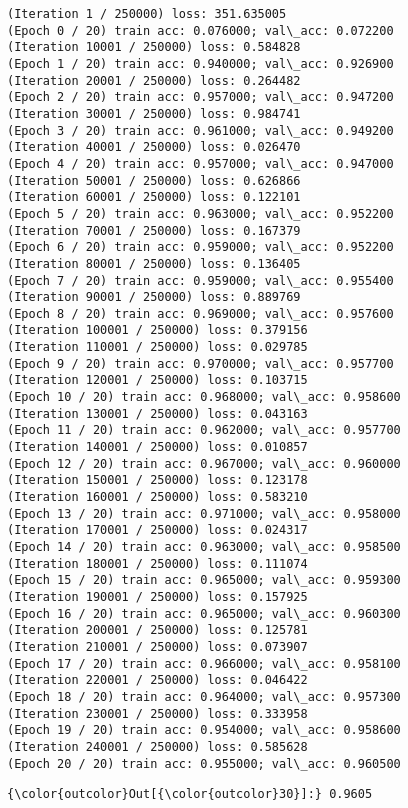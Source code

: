 \documentclass[a4paper,12pt]{article}
\begin{document}
    \begin{Verbatim}[commandchars=\\\{\}]
(Iteration 1 / 250000) loss: 351.635005
(Epoch 0 / 20) train acc: 0.076000; val\_acc: 0.072200
(Iteration 10001 / 250000) loss: 0.584828
(Epoch 1 / 20) train acc: 0.940000; val\_acc: 0.926900
(Iteration 20001 / 250000) loss: 0.264482
(Epoch 2 / 20) train acc: 0.957000; val\_acc: 0.947200
(Iteration 30001 / 250000) loss: 0.984741
(Epoch 3 / 20) train acc: 0.961000; val\_acc: 0.949200
(Iteration 40001 / 250000) loss: 0.026470
(Epoch 4 / 20) train acc: 0.957000; val\_acc: 0.947000
(Iteration 50001 / 250000) loss: 0.626866
(Iteration 60001 / 250000) loss: 0.122101
(Epoch 5 / 20) train acc: 0.963000; val\_acc: 0.952200
(Iteration 70001 / 250000) loss: 0.167379
(Epoch 6 / 20) train acc: 0.959000; val\_acc: 0.952200
(Iteration 80001 / 250000) loss: 0.136405
(Epoch 7 / 20) train acc: 0.959000; val\_acc: 0.955400
(Iteration 90001 / 250000) loss: 0.889769
(Epoch 8 / 20) train acc: 0.969000; val\_acc: 0.957600
(Iteration 100001 / 250000) loss: 0.379156
(Iteration 110001 / 250000) loss: 0.029785
(Epoch 9 / 20) train acc: 0.970000; val\_acc: 0.957700
(Iteration 120001 / 250000) loss: 0.103715
(Epoch 10 / 20) train acc: 0.968000; val\_acc: 0.958600
(Iteration 130001 / 250000) loss: 0.043163
(Epoch 11 / 20) train acc: 0.962000; val\_acc: 0.957700
(Iteration 140001 / 250000) loss: 0.010857
(Epoch 12 / 20) train acc: 0.967000; val\_acc: 0.960000
(Iteration 150001 / 250000) loss: 0.123178
(Iteration 160001 / 250000) loss: 0.583210
(Epoch 13 / 20) train acc: 0.971000; val\_acc: 0.958000
(Iteration 170001 / 250000) loss: 0.024317
(Epoch 14 / 20) train acc: 0.963000; val\_acc: 0.958500
(Iteration 180001 / 250000) loss: 0.111074
(Epoch 15 / 20) train acc: 0.965000; val\_acc: 0.959300
(Iteration 190001 / 250000) loss: 0.157925
(Epoch 16 / 20) train acc: 0.965000; val\_acc: 0.960300
(Iteration 200001 / 250000) loss: 0.125781
(Iteration 210001 / 250000) loss: 0.073907
(Epoch 17 / 20) train acc: 0.966000; val\_acc: 0.958100
(Iteration 220001 / 250000) loss: 0.046422
(Epoch 18 / 20) train acc: 0.964000; val\_acc: 0.957300
(Iteration 230001 / 250000) loss: 0.333958
(Epoch 19 / 20) train acc: 0.954000; val\_acc: 0.958600
(Iteration 240001 / 250000) loss: 0.585628
(Epoch 20 / 20) train acc: 0.955000; val\_acc: 0.960500

    \end{Verbatim}

\begin{Verbatim}[commandchars=\\\{\}]
{\color{outcolor}Out[{\color{outcolor}30}]:} 0.9605
\end{Verbatim}
\end{document}
